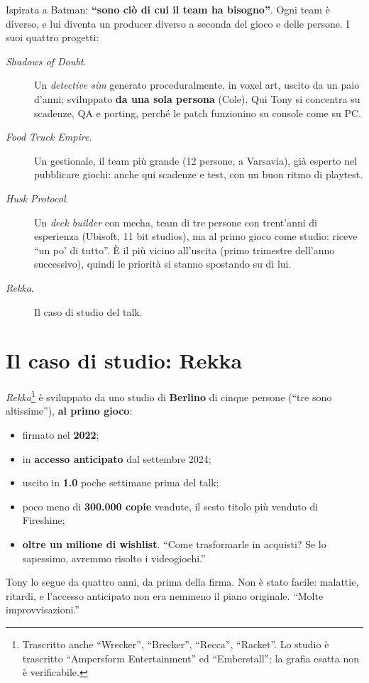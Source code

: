 Ispirata a Batman: \textbf{``sono ciò di cui il team ha bisogno''}. Ogni team è
diverso, e lui diventa un producer diverso a seconda del gioco e delle persone. I
suoi quattro progetti:
\begin{description}
  \item[\emph{Shadows of Doubt}.] Un \emph{detective sim} generato proceduralmente,
        in voxel art, uscito da un paio d'anni; sviluppato \textbf{da una sola
        persona} (Cole). Qui Tony si concentra su scadenze, QA e porting, perché le
        patch funzionino su console come su PC.
  \item[\emph{Food Truck Empire}.] Un gestionale, il team più grande (12 persone,
        a Varsavia), già esperto nel pubblicare giochi: anche qui scadenze e
        test, con un buon ritmo di playtest.
  \item[\emph{Husk Protocol}.] Un \emph{deck builder} con mecha, team di tre
        persone con trent'anni di esperienza (Ubisoft, 11 bit studios), ma al primo
        gioco come studio: riceve ``un po' di tutto''. È il più vicino all'uscita
        (primo trimestre dell'anno successivo), quindi le priorità si stanno
        spostando su di lui.
  \item[\emph{Rekka}.] Il caso di studio del talk.
\end{description}

\section{Il caso di studio: Rekka}
\label{sec:c2-2-rekka}

\emph{Rekka}\footnote{Trascritto anche ``Wrecker'', ``Brecker'', ``Recca'',
``Racket''. Lo studio è trascritto ``Ampersform Entertainment'' ed
``Emberstall''; la grafia esatta non è verificabile.} è sviluppato da uno studio di
\textbf{Berlino} di cinque persone (``tre sono altissime''), \textbf{al primo
gioco}:
\begin{itemize}
  \item firmato nel \textbf{2022};
  \item in \textbf{accesso anticipato} dal settembre 2024;
  \item uscito in \textbf{1.0} poche settimane prima del talk;
  \item poco meno di \textbf{300.000 copie} vendute, il sesto titolo più venduto di
        Fireshine;
  \item \textbf{oltre un milione di wishlist}. ``Come trasformarle in acquisti? Se
        lo sapessimo, avremmo risolto i videogiochi.''
\end{itemize}
Tony lo segue da quattro anni, da prima della firma. Non è stato facile: malattie,
ritardi, e l'accesso anticipato non era nemmeno il piano originale. ``Molte
improvvisazioni.''

